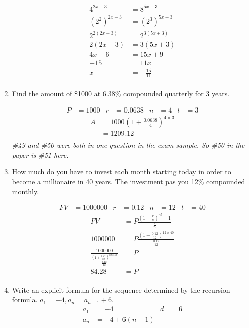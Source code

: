 \documentclass[paper=a4, fontsize=11pt]{scrartcl}
\begin{document}
\begin{enumerate}[resume]
    \begin{align*}
        4^{2x-3}&=8^{5x+3}\\
        (2^2)^{2x-3}&=(2^3)^{5x+3}\\
        2^{2(2x-3)}&=2^{3(5x+3)}\\
        2(2x-3)&=3(5x+3)\\
        4x-6&=15x+9\\
        -15&=11x\\
        x&=-\frac{15}{11}\\
    \end{align*}
    \item Find the amount of \$1000 at 6.38\% compounded quarterly for 3 years. 
    
    \begin{align*}
        P&=1000&r&=0.0638&n&=4&t&=3
    \end{align*}
    \begin{align*}
        A&=1000(1+\frac{0.0638}{4})^{4\times3}\\
        &=1209.12\\
    \end{align*}
    \textit{\#49 and \#50 were both in one question in the exam sample. So \#50 in the paper is \#51 here.}

    \item How much do you have to invest each month starting today in order to become a millionaire in 40 years. The investment pas you 12\% compounded monthly.
    
    \begin{align*}
        FV&=1000000&r&=0.12&n&=12&t&=40
    \end{align*}
    \begin{align*}
        FV&=P\frac{(1+\frac{r}{n})^{nt}-1}{\frac{r}{n}}\\
        1000000&=P\frac{(1+\frac{0.12}{12})^{12\times40}}{\frac{0.12}{12}}\\
        \frac{1000000}{\frac{(1+\frac{0.12}{12})^{12\times40}}{\frac{0.12}{12}}}&=P\\
        84.28&=P\\
    \end{align*}
    \item Write an explicit formula for the sequence determined by the recursion formula. $a_1=-4,a_n=a_{n-1}+6$.
    \begin{align*}
        a_1&=-4&d&=6\\
        a_n&=-4+6(n-1)\\
    \end{align*}
\end{enumerate}
\end{document}
